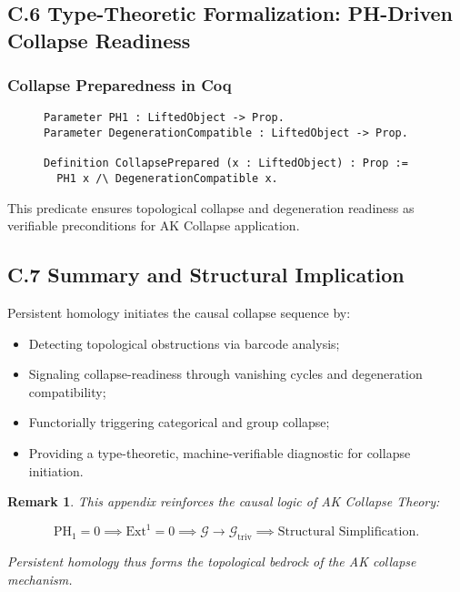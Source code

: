 \documentclass[11pt]{article}
\newtheorem{remark}[theorem]{Remark}
\begin{document}
\subsection*{C.6 Type-Theoretic Formalization: PH-Driven Collapse Readiness}

\subsubsection*{Collapse Preparedness in Coq}

\begin{figure}[h]
\centering
\begin{lstlisting}[language=Coq, caption=Persistent Homology Driven Collapse Readiness]
Parameter PH1 : LiftedObject -> Prop.
Parameter DegenerationCompatible : LiftedObject -> Prop.

Definition CollapsePrepared (x : LiftedObject) : Prop :=
  PH1 x /\ DegenerationCompatible x.
\end{lstlisting}
\end{figure}

This predicate ensures topological collapse and degeneration readiness as verifiable preconditions for AK Collapse application.

\subsection*{C.7 Summary and Structural Implication}

Persistent homology initiates the causal collapse sequence by:

\begin{itemize}
    \item Detecting topological obstructions via barcode analysis;
    \item Signaling collapse-readiness through vanishing cycles and degeneration compatibility;
    \item Functorially triggering categorical and group collapse;
    \item Providing a type-theoretic, machine-verifiable diagnostic for collapse initiation.
\end{itemize}

\begin{remark}
This appendix reinforces the causal logic of AK Collapse Theory:

\[
\mathrm{PH}_1 = 0 \implies \mathrm{Ext}^1 = 0 \implies \mathcal{G} \longrightarrow \mathcal{G}_{\mathrm{triv}} \implies \text{Structural Simplification}.
\]

Persistent homology thus forms the topological bedrock of the AK collapse mechanism.

\end{remark}
\end{document}
